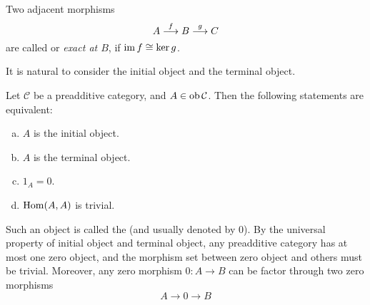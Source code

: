 \begin{defn}
  Two adjacent morphisms
  \begin{equation*}
    A\stackrel{{f}}{\longrightarrow}B\stackrel{{g}}{\longrightarrow}C
  \end{equation*}
  are called  or \emph{\red  exact at $B$}, if $\operatorname{im} f\cong\ker g$.
\end{defn}
It is natural to consider the initial object and the terminal object.
\begin{prop}
  Let $\mathcal{C}$ be a preadditive category, and $A\in\operatorname{ob}\mathcal{C}$. Then the following statements are equivalent:
  \begin{enumerate}[a)]
    \setlength{\itemindent}{2ex}
    \item $A$ is the initial object.
    \item $A$ is the terminal object.
    \item $1_A=0$.
    \item $\operatorname{Hom}(A,A)$ is trivial.
  \end{enumerate}
\end{prop}
Such an object is called the  (and usually denoted by $0$). By the universal property of initial object and terminal object, any preadditive category has at most one zero object, and the morphism set between zero object and others must be trivial. Moreover, any zero morphism $0\colon A\to B$ can be factor through two zero morphisms
\begin{equation*}
  A\longrightarrow 0 \longrightarrow B
\end{equation*}

